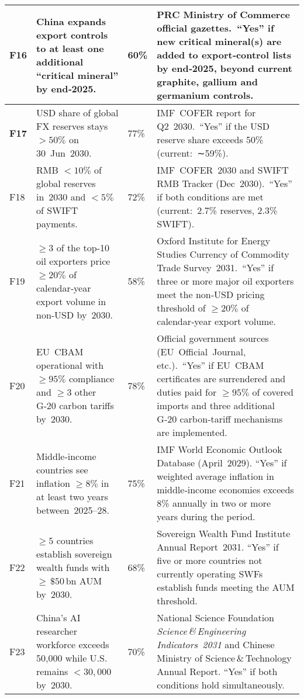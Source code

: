 \documentclass{article}
\begin{document}
\begin{longtable}{@{}>{\bfseries}p{} p{} p{} p{}@{}}
F16 & China expands export controls to at least one additional “critical mineral” by end‑2025. & 60\% & PRC Ministry of Commerce official gazettes. “\!Yes” if new critical mineral(s) are added to export‑control lists by end‑2025, beyond current graphite, gallium and germanium controls. \\
\midrule

F17 & USD share of global FX reserves stays $>50\%$ on 30 Jun 2030. & 77\% & IMF COFER report for Q2 2030. “\!Yes” if the USD reserve share exceeds 50\% (current: ∼59\%). \\
\midrule

F18 & RMB $<10\%$ of global reserves in 2030 and $<5\%$ of SWIFT payments. & 72\% & IMF COFER 2030 and SWIFT RMB Tracker (Dec 2030). “\!Yes” if both conditions are met (current: 2.7\% reserves, 2.3\% SWIFT). \\
\midrule

F19 & $\geq 3$ of the top‑10 oil exporters price $\geq 20\%$ of calendar‑year export volume in non‑USD by 2030. & 58\% & Oxford Institute for Energy Studies Currency of Commodity Trade Survey 2031. “\!Yes” if three or more major oil exporters meet the non‑USD pricing threshold of $\geq 20\%$ of calendar‑year export volume. \\
\midrule

F20 & EU CBAM operational with $\geq 95\%$ compliance and $\geq 3$ other G‑20 carbon tariffs by 2030. & 78\% & Official government sources (EU Official Journal, etc.). “\!Yes” if EU CBAM certificates are surrendered and duties paid for $\geq 95\%$ of covered imports and three additional G‑20 carbon‑tariff mechanisms are implemented. \\
\midrule

F21 & Middle‑income countries see inflation $\geq 8\%$ in at least two years between 2025–28. & 75\% & IMF World Economic Outlook Database (April 2029). “\!Yes” if weighted average inflation in middle‑income economies exceeds 8\% annually in two or more years during the period. \\
\midrule

F22 & $\geq 5$ countries establish sovereign wealth funds with $\geq\,\$50\,\mathrm{bn}$ AUM by 2030. & 68\% & Sovereign Wealth Fund Institute Annual Report 2031. “\!Yes” if five or more countries not currently operating SWFs establish funds meeting the AUM threshold. \\
\midrule

F23 & China’s AI researcher workforce exceeds 50{,}000 while U.S. remains $<30{,}000$ by 2030. & 70\% & National Science Foundation \emph{Science\,\&\,Engineering Indicators 2031} and Chinese Ministry of Science\,\&\,Technology Annual Report. “\!Yes” if both conditions hold simultaneously. \\
\midrule


\end{longtable}
\end{document}

